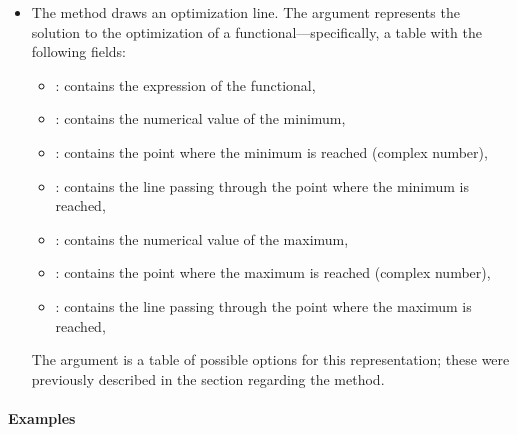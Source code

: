 \begin{itemize}
\begin{itemize}
\begin{itemize}
            \item {}, the label's writing direction; by default, this follows the direction of the line.
    
            \item {}, position of the label relative to its anchor point; by default, the label is placed on the side of the solution polygon opposite the anchor. 
        \end{itemize}
    \end{itemize}

    \item The method  draws an optimization line. The  argument represents the solution to the optimization of a functional—specifically, a table with the following fields:
    \begin{itemize}
        \item {}: contains the expression of the functional,
        \item {}: contains the numerical value of the minimum,
        \item {}: contains the point where the minimum is reached (complex number),
        \item {}: contains the line passing through the point where the minimum is reached,
        \item {}: contains the numerical value of the maximum,
        \item {}: contains the point where the maximum is reached (complex number),
        \item {}: contains the line passing through the point where the maximum is reached,
    \end{itemize}
    The  argument is a table of possible options for this representation; these were previously described in the section regarding the  method.
\end{itemize}

\paragraph{Examples}

